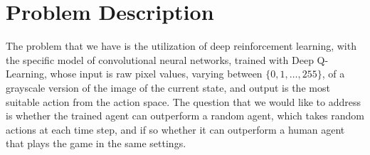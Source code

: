 \section{Problem Description}
The problem that we have is the utilization of deep reinforcement learning, with the specific model of convolutional neural networks, trained with Deep Q-Learning, whose input is raw pixel values, varying between \( \{0, 1, \dots, 255\} \), of a grayscale version of the image of the current state, and output is the most suitable action from the action space. The question that we would like to address is whether the trained agent can outperform a random agent, which takes random actions at each time step, and if so whether it can outperform a human agent that plays the game in the same settings.
